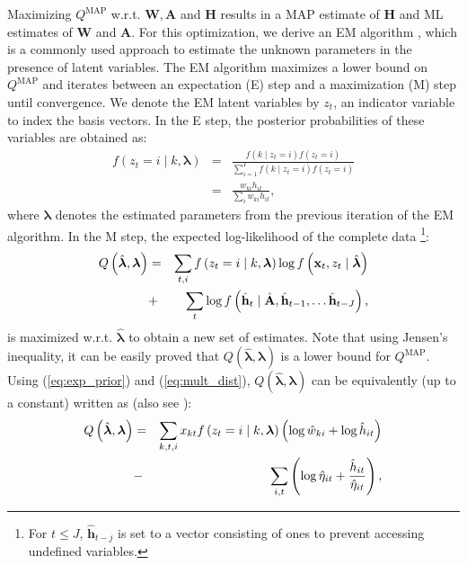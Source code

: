 \documentclass[10pt,twocolumn,twoside] {IEEEtran}
\begin{document}
Maximizing $Q^{\text{MAP}}$ w.r.t. $\mathbf{W},\mathbf{A}$ and $\mathbf{H}$ results in a MAP estimate of $\mathbf{H}$
and ML estimates of $\mathbf{W}$ and $\mathbf{A}$. For this optimization,
we derive an EM algorithm \cite{bishop2006}, which is a commonly used
approach to estimate the unknown parameters in the presence of latent
variables. The EM algorithm maximizes a lower bound on $Q^{\text{MAP}}$ and iterates
between an expectation (E) step and a maximization (M) step until convergence.
We denote the EM latent variables by $z_t$, an indicator variable to
index the basis vectors. In the E step, the posterior probabilities
of these variables are obtained as:
\begin{eqnarray}
f\left(z_{t}=i\mid k,\boldsymbol{\lambda}\right) & = & \frac{f\left(k\mid z_t=i\right)f\left(z_{t}=i\right)}{\sum_{i=1}^{I}f\left(k\mid z_t=i\right)f\left(z_{t}=i\right)}\nonumber \\
 & = & \frac{w_{ki}h_{it}}{\sum_{i}w_{ki}h_{it}},\label{eq:E_step}
\end{eqnarray}
where $\boldsymbol{\lambda}$ denotes the estimated parameters from
the previous iteration of the EM algorithm. In the M step,
the expected log-likelihood of the complete data \cite[Chapter 9]{bishop2006}%
\footnote{For $t\leq J$, $\hat{\mathbf{h}}_{t-j}$
is set to a vector consisting of ones to prevent accessing undefined variables.%
}:
\begin{eqnarray}
Q\left(\hat{\boldsymbol{\lambda}},\boldsymbol{\lambda}\right) & = & \sum_{t,i}f\left(z_{t}=i\mid k,\boldsymbol{\lambda}\right)\log f\left(\mathbf{x}_{t},z_{t}\mid\hat{\boldsymbol{\lambda}}\right)\notag\\
 & + & \sum_{t}\log f\left(\hat{\mathbf{h}}_{t}\mid\hat{\mathbf{A}},\hat{\mathbf{h}}_{t-1},\ldots\hat{\mathbf{h}}_{t-J}\right),\label{eq:EM_lowerbound_prior}
\end{eqnarray}
is maximized w.r.t. $\hat{\boldsymbol{\lambda}}$ to obtain
a new set of estimates. Note that using Jensen's inequality, it can be easily proved that $Q\left(\hat{\boldsymbol{\lambda}},\boldsymbol{\lambda}\right)$
is a lower bound for $Q^{\text{MAP}}$. Using (\ref{eq:exp_prior}) and (\ref{eq:mult_dist}), $Q\left(\hat{\boldsymbol{\lambda}},\boldsymbol{\lambda}\right)$
can be equivalently (up to a constant) written as (also see \cite{Shashanka2007a}):
\begin{eqnarray}
Q\left(\hat{\boldsymbol{\lambda}},\boldsymbol{\lambda}\right) & = & \sum_{k,t,i}x_{kt}f\left(z_{t}=i\mid k,\boldsymbol{\lambda}\right)\left(\log\hat{w}_{ki}+\log\hat{h}_{it}\right)\notag\\
 & - & \sum_{i,t}\left(\log\hat{\eta}_{it}+\frac{\hat{h}_{it}}{\hat{\eta}_{it}}\right),\label{eq:EM_lowerbound2_prior}
\end{eqnarray}
\end{document}
